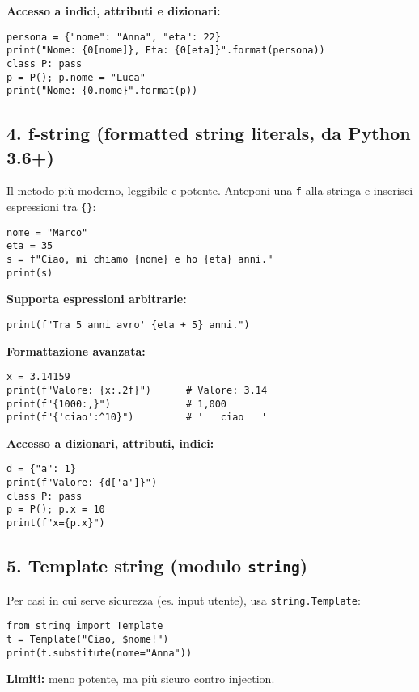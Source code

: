 \documentclass[a4paper,12pt]{article}
\begin{document}
\textbf{Accesso a indici, attributi e dizionari:}
\begin{lstlisting}
persona = {"nome": "Anna", "eta": 22}
print("Nome: {0[nome]}, Eta: {0[eta]}".format(persona))
class P: pass
p = P(); p.nome = "Luca"
print("Nome: {0.nome}".format(p))
\end{lstlisting}

\subsection*{4. f-string (formatted string literals, da Python 3.6+)}
Il metodo più moderno, leggibile e potente. Anteponi una \texttt{f} alla stringa e inserisci espressioni tra \texttt{\{\}}:
\begin{lstlisting}
nome = "Marco"
eta = 35
s = f"Ciao, mi chiamo {nome} e ho {eta} anni."
print(s)
\end{lstlisting}
\textbf{Supporta espressioni arbitrarie:}
\begin{lstlisting}
print(f"Tra 5 anni avro' {eta + 5} anni.")
\end{lstlisting}
\textbf{Formattazione avanzata:}
\begin{lstlisting}
x = 3.14159
print(f"Valore: {x:.2f}")      # Valore: 3.14
print(f"{1000:,}")             # 1,000
print(f"{'ciao':^10}")         # '   ciao   '
\end{lstlisting}
\textbf{Accesso a dizionari, attributi, indici:}
\begin{lstlisting}
d = {"a": 1}
print(f"Valore: {d['a']}")
class P: pass
p = P(); p.x = 10
print(f"x={p.x}")
\end{lstlisting}

\subsection*{5. Template string (modulo \texttt{string})}
Per casi in cui serve sicurezza (es. input utente), usa \texttt{string.Template}:
\begin{lstlisting}
from string import Template
t = Template("Ciao, $nome!")
print(t.substitute(nome="Anna"))
\end{lstlisting}
\textbf{Limiti:} meno potente, ma più sicuro contro injection.
\end{document}
